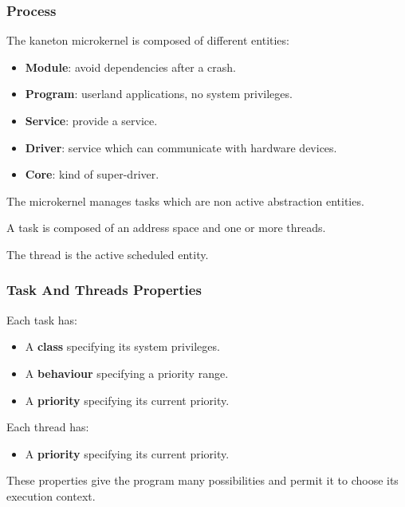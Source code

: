 \begin{frame}
  \frametitle{Process}

  The kaneton microkernel is composed of different entities:

  \begin{itemize}
    \item
      \textbf{Module}: avoid dependencies after a crash.
    \item
      \textbf{Program}: userland applications, no system privileges.
    \item
      \textbf{Service}: provide a service.
    \item
      \textbf{Driver}: service which can communicate with hardware devices.
    \item
      \textbf{Core}: kind of super-driver.
  \end{itemize}

  \-

  The microkernel manages tasks which are non active abstraction entities.

  \-

  A task is composed of an address space and one or more threads.

  \-

  The thread is the active scheduled entity.
\end{frame}


\begin{frame}
  \frametitle{Task And Threads Properties}

  Each task has:

  \begin{itemize}
    \item
      A \textbf{class} specifying its system privileges.
    \item
      A \textbf{behaviour} specifying a priority range.
    \item
      A \textbf{priority} specifying its current priority.
  \end{itemize}

  \-

  Each thread has:

  \begin{itemize}
    \item
      A \textbf{priority} specifying its current priority.
  \end{itemize}

  \-

  These properties give the program many possibilities and
  permit it to choose its execution context.
\end{frame}

